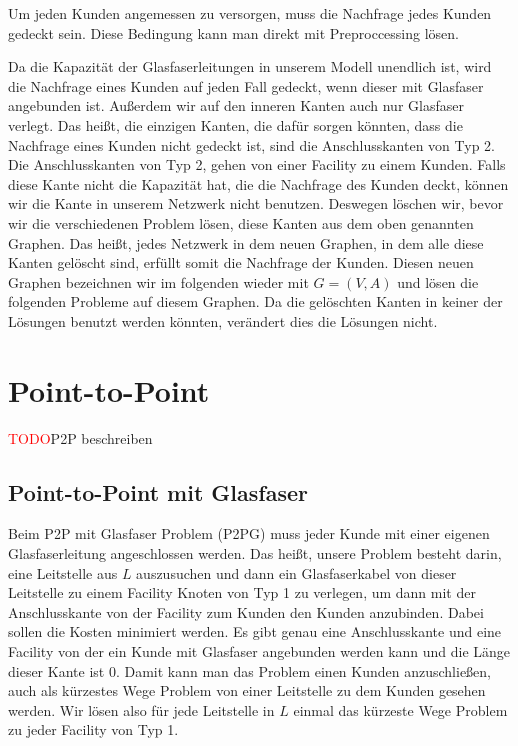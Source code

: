 \documentclass[11pt,a4paper]{article}
\newcommand{\TODO}{\textcolor{red}{TODO}}
\theoremstyle{my_th_style1}
\begin{document}
Um jeden Kunden angemessen zu versorgen, muss die Nachfrage jedes Kunden gedeckt sein. Diese Bedingung kann man direkt mit Preproccessing lösen.

Da die Kapazität der Glasfaserleitungen in unserem Modell unendlich ist, wird die Nachfrage eines Kunden auf jeden Fall gedeckt, wenn dieser mit Glasfaser angebunden ist. Außerdem wir auf den inneren Kanten auch nur Glasfaser verlegt. Das heißt, die einzigen Kanten, die dafür sorgen könnten, dass die Nachfrage eines Kunden nicht gedeckt ist, sind die Anschlusskanten von Typ 2. Die Anschlusskanten von Typ 2, gehen von einer Facility zu einem Kunden. Falls diese Kante nicht die Kapazität hat, die  die Nachfrage des Kunden deckt, können wir die Kante in unserem Netzwerk nicht benutzen. Deswegen löschen wir, bevor wir die verschiedenen Problem lösen, diese Kanten aus dem oben genannten Graphen. Das heißt, jedes Netzwerk in dem neuen Graphen, in dem alle diese Kanten gelöscht sind, erfüllt somit die Nachfrage der Kunden. Diesen neuen Graphen bezeichnen wir im folgenden wieder mit $G=(V,A)$ und lösen die folgenden Probleme auf diesem Graphen. Da die gelöschten Kanten in keiner der Lösungen benutzt werden könnten, verändert dies die Lösungen nicht.

\section{Point-to-Point}

\TODO P2P beschreiben

\subsection{Point-to-Point mit Glasfaser}

Beim P2P mit Glasfaser Problem (P2PG) muss jeder Kunde mit einer eigenen Glasfaserleitung angeschlossen werden. Das heißt, unsere Problem besteht darin, eine Leitstelle aus $L$ auszusuchen und dann ein Glasfaserkabel von dieser Leitstelle zu einem Facility Knoten von Typ 1 zu verlegen, um dann mit der Anschlusskante von der Facility zum Kunden den Kunden anzubinden. Dabei sollen die Kosten minimiert werden. Es gibt genau eine Anschlusskante und eine Facility von der ein Kunde mit Glasfaser angebunden werden kann und die Länge dieser Kante ist 0. Damit kann man das Problem einen Kunden anzuschließen, auch als kürzestes Wege Problem von einer Leitstelle zu dem Kunden gesehen werden. Wir lösen also für jede Leitstelle in $L$ einmal das kürzeste Wege Problem zu jeder Facility von Typ 1.
\end{document}
